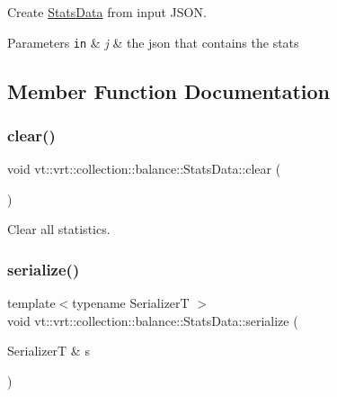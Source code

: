 Create {\ttfamily \hyperlink{structvt_1_1vrt_1_1collection_1_1balance_1_1_stats_data}{Stats\+Data}} from input J\+S\+ON. 


\begin{DoxyParams}[1]{Parameters}
\mbox{\tt in}  & {\em j} & the json that contains the stats \\
\hline
\end{DoxyParams}


\subsection{Member Function Documentation}
\mbox{\label{structvt_1_1vrt_1_1collection_1_1balance_1_1_stats_data_a48628fce8e2356413520fed69a800bc4}} 
\subsubsection{\texorpdfstring{clear()}{clear()}}
{\footnotesize\ttfamily void vt\+::vrt\+::collection\+::balance\+::\+Stats\+Data\+::clear (\begin{DoxyParamCaption}{ }\end{DoxyParamCaption})}



Clear all statistics. 

\mbox{\label{structvt_1_1vrt_1_1collection_1_1balance_1_1_stats_data_a333902a2dd2dd9d8a9471f51a5d94e5f}} 
\subsubsection{\texorpdfstring{serialize()}{serialize()}}
{\footnotesize\ttfamily template$<$typename SerializerT $>$ \\
void vt\+::vrt\+::collection\+::balance\+::\+Stats\+Data\+::serialize (\begin{DoxyParamCaption}\item[{SerializerT \&}]{s }\end{DoxyParamCaption})\hspace{0.3cm}{\ttfamily [inline]}}

